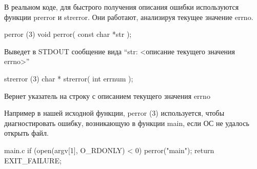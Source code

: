 В реальном коде, для быстрого получения описания ошибки используются функции prerror и strerror. Они работают, анализируя текущее значение errno.

\begin{CCode}{perror (3)}
	void perror(
		const char *str
	); \end{CCode}
Выведет в STDOUT сообщение вида “str:  <описание текущего значения errno>”

\begin{CCode}{strerror (3)}
	char * strerror(
		int errnum
	); \end{CCode}
Вернет указатель на строку с описанием текущего значения errno


Например в нашей исходной функции, perror (3) используется, чтобы диагностировать ошибку, возникающую в функции main, если ОС не удалось открыть файл.

\begin{CCode}{main.c}
	if (open(argv[1], O_RDONLY) < 0) {
		perror("main");			
		return EXIT_FAILURE;
	} \end{CCode}	 